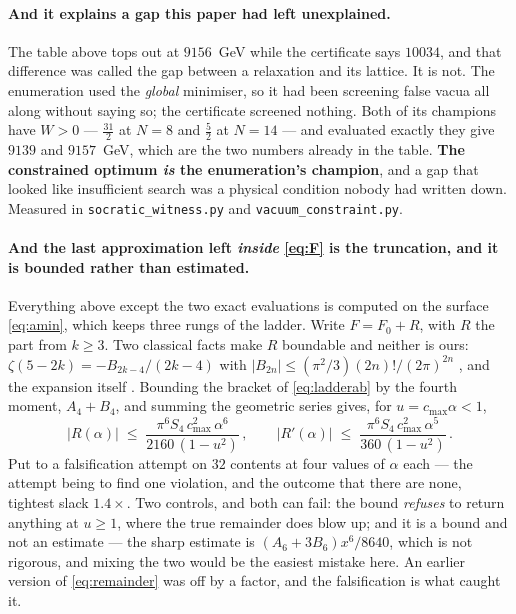 \documentclass[11pt,a4paper]{article}
\begin{document}
\paragraph{And it explains a gap this paper had left unexplained.} The table above tops out at
$9156$~GeV while the certificate says $10034$, and that difference was called the gap between a
relaxation and its lattice. It is not. The enumeration used the \emph{global} minimiser, so it had
been screening false vacua all along without saying so; the certificate screened nothing. Both of
its champions have $W>0$ --- $\tfrac{31}{2}$ at $N=8$ and $\tfrac52$ at $N=14$ --- and evaluated exactly they give
$9139$ and $9157$~GeV, which are the two numbers already in the table. \textbf{The constrained
optimum \emph{is} the enumeration's champion}, and a gap that looked like insufficient search was a
physical condition nobody had written down. Measured in \texttt{socratic\_\allowbreak witness.py}
and \texttt{vacuum\_\allowbreak constraint.py}.

\paragraph{And the last approximation left \emph{inside} \eqref{eq:F} is the truncation, and it
is bounded rather than estimated.} Everything above except the two exact evaluations is computed on the surface
\eqref{eq:amin}, which keeps three rungs of the ladder. Write $F=F_0+R$, with $R$ the part from
$k\ge3$. Two classical facts make $R$ boundable and neither is ours: $\zeta(5-2k)=-B_{2k-4}/(2k-4)$
with $|B_{2n}|\le(\pi^2/3)(2n)!/(2\pi)^{2n}$ \cite{Apostol}, and the expansion itself \cite{Lewin}.
Bounding the bracket of \eqref{eq:ladderab} by the fourth moment, $A_4+B_4$, and summing the
geometric series gives, for $u=c_{\max}\alpha<1$,
\begin{equation}\label{eq:remainder}
  |R(\alpha)|\;\le\;\frac{\pi^{6}S_4\,c_{\max}^{2}\,\alpha^{6}}{2160\,(1-u^{2})}\,,\qquad
  |R'(\alpha)|\;\le\;\frac{\pi^{6}S_4\,c_{\max}^{2}\,\alpha^{5}}{360\,(1-u^{2})}\,.
\end{equation}
Put to a falsification attempt on $32$ contents at four values of $\alpha$ each --- the attempt
being to find one violation, and the outcome that there are none, tightest slack
$1.4\times$. Two controls, and both can fail: the bound \emph{refuses} to return anything at
$u\ge1$, where the true remainder does blow up; and it is a bound and not an estimate --- the sharp
estimate is $(A_6+3B_6)x^6/8640$, which is not rigorous, and mixing the two would be the easiest
mistake here. An earlier version of \eqref{eq:remainder} was off by a factor, and the falsification
is what caught it.
\end{document}
